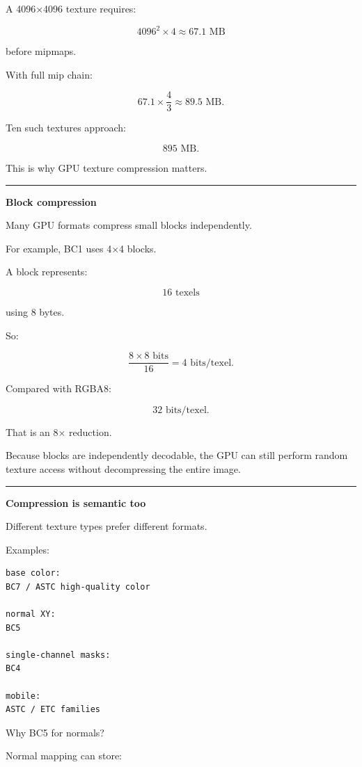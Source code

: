 A 4096×4096 texture requires:

\[
4096^2\times4
\approx67.1\text{ MB}
\]

before mipmaps.

With full mip chain:

\[
67.1\times\frac43
\approx89.5\text{ MB}.
\]

Ten such textures approach:

\[
895\text{ MB}.
\]

This is why GPU texture compression matters.

\begin{center}\rule{0.5\linewidth}{0.5pt}\end{center}

\textbf{Block compression}

Many GPU formats compress small blocks independently.

For example, BC1 uses 4×4 blocks.

A block represents:

\[
16\text{ texels}
\]

using 8 bytes.

So:

\[
\frac{8\times8\text{ bits}}
{16}
=
4\text{ bits/texel}.
\]

Compared with RGBA8:

\[
32\text{ bits/texel}.
\]

That is an 8× reduction.

Because blocks are independently decodable, the GPU can still perform random texture access without decompressing the entire image.

\begin{center}\rule{0.5\linewidth}{0.5pt}\end{center}

\textbf{Compression is semantic too}

Different texture types prefer different formats.

Examples:

\begin{verbatim}
base color:
BC7 / ASTC high-quality color

normal XY:
BC5

single-channel masks:
BC4

mobile:
ASTC / ETC families
\end{verbatim}

Why BC5 for normals?

Normal mapping can store:

